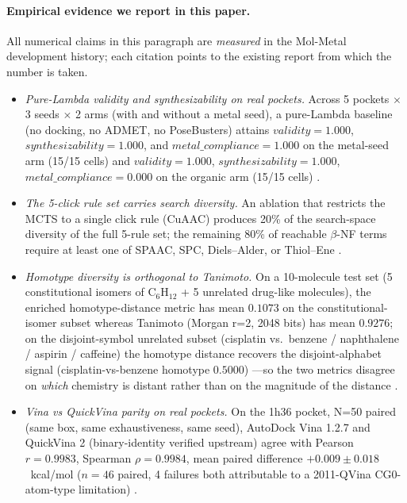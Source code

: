 \paragraph{Empirical evidence we report in this paper.}
All numerical claims in this paragraph are \emph{measured} in the
Mol-Metal development history; each citation points to the existing
report from which the number is taken.
\begin{itemize}
  \item \emph{Pure-Lambda validity and synthesizability on real
  pockets.} Across 5 pockets $\times$ 3 seeds $\times$ 2 arms (with
  and without a metal seed), a pure-Lambda baseline (no docking,
  no ADMET, no PoseBusters) attains
  $\mathit{validity}=1.000$, $\mathit{synthesizability}=1.000$, and
  $\mathit{metal\_compliance}=1.000$ on the metal-seed arm
  (15/15 cells) and $\mathit{validity}=1.000$,
  $\mathit{synthesizability}=1.000$, $\mathit{metal\_compliance}=0.000$
  on the organic arm (15/15 cells) \cite{footnote:wf_lambda1c}.
  \item \emph{The 5-click rule set carries search diversity.}
  An ablation that restricts the MCTS to a single click rule (CuAAC)
  produces 20\% of the search-space diversity of the full 5-rule
  set; the remaining 80\% of reachable $\beta$-NF terms require
  at least one of SPAAC, SPC, Diels--Alder, or Thiol--Ene
  \cite{footnote:wf_lambda1}.
  \item \emph{Homotype diversity is orthogonal to Tanimoto.}
  On a 10-molecule test set (5 constitutional isomers of C$_6$H$_{12}$
  + 5 unrelated drug-like molecules), the enriched homotype-distance
  metric has mean $0.1073$ on the constitutional-isomer subset
  whereas Tanimoto (Morgan r=2, 2048 bits) has mean $0.9276$; on the
  disjoint-symbol unrelated subset (cisplatin vs.\ benzene /
  naphthalene / aspirin / caffeine) the homotype distance recovers
  the disjoint-alphabet signal (cisplatin-vs-benzene homotype
  $0.5000$)
  ---so the two metrics disagree on {\em which} chemistry is
  distant rather than on the magnitude of the distance
  \cite{footnote:wf_lambda2e}.
  \item \emph{Vina vs QuickVina parity on real pockets.}
  On the 1h36 pocket, N=50 paired (same box, same exhaustiveness,
  same seed), AutoDock Vina 1.2.7 and QuickVina 2 (binary-identity
  verified upstream) agree with Pearson $r=0.9983$, Spearman
  $\rho=0.9984$, mean paired difference $+0.009\pm0.018$~kcal/mol
  ($n=46$ paired, 4 failures both attributable to a 2011-QVina
  CG0-atom-type limitation)
  \cite{footnote:round11_parity}.

\end{itemize}
